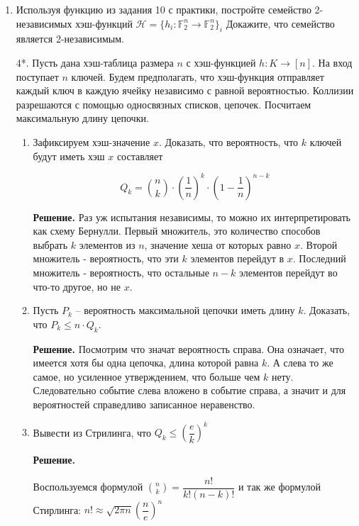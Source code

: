 \begin{enumerate}
	\item Используя функцию из задания 10 с практики, постройте семейство 2-независимых хэш-функций $\mathcal{H} 
	= \{h_i: \mathbb{F}^n_2 \rightarrow \mathbb{F}^n_2\}_i$ Докажите, что семейство является 2-независимым.
		
	\item[4*.] Пусть дана хэш-таблица размера $n$ с хэш-функцией $h : K \rightarrow [n]$. На вход поступает $n$ 
	ключей. Будем предполагать, что хэш-функция отправляет каждый ключ в каждую ячейку независимо с равной 
	вероятностью. Коллизии разрешаются с помощью односвязных списков, цепочек. Посчитаем максимальную длину 
	цепочки.
	
	\begin{enumerate}
		\item Зафиксируем хэш-значение $x$. Доказать, что вероятность, что $k$ ключей будут иметь хэш $x$ 
		составляет
		
		\begin{equation*}
			Q_k = \binom{n}{k}\cdot \left( \frac{1}{n} \right)^k \cdot \left(1 - \frac{1}{n} \right)^{n-k}
		\end{equation*}
		
		\textbf{Решение.} Раз уж испытания независимы, то можно их интерпретировать как схему Бернулли. Первый 
		множитель, это количество способов выбрать $k$ элементов из $n$, значение хеша от которых равно $x$. 
		Второй множитель - вероятность, что эти $k$ элементов перейдут в $x$. Последний множитель - вероятность, 
		что остальные $n - k$ элементов перейдут во что-то другое, но не $x$.
		
		\item Пусть $P_k$ – вероятность максимальной цепочки иметь длину $k$. Доказать, что $P_k \leqslant n 
		\cdot Q_k$.
		
		\textbf{Решение.} Посмотрим что значат вероятность справа. Она означает, что имеется хотя бы одна 
		цепочка, длина которой равна $k$. А слева то же самое, но усиленное утверждением, что больше чем $k$ 
		нету. Следовательно событие слева вложено в событие справа, а значит и для вероятностей справедливо 
		записанное неравенство.
		
		\item Вывести из Стрилинга, что $Q_k \le \left(\dfrac{e}{k}\right)^k$
		
		\textbf{Решение.} 
		
		Воспользуемся формулой $\binom{n}{k} = \dfrac{n!}{k!(n-k)!}$ и так же формулой Стирлинга: $n! \approx \sqrt{2\pi n}\left(\dfrac{n}{e}\right)^n$
		

\end{enumerate}
\end{enumerate}
